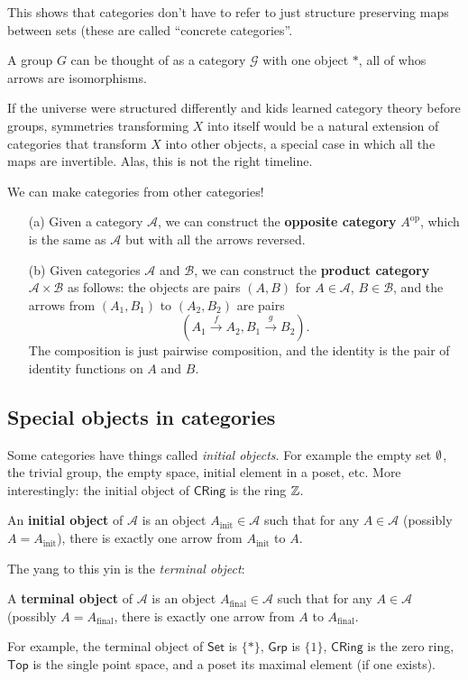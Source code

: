 This shows that categories don't have to refer to just structure preserving maps between sets (these are called ``concrete categories''.
\begin{example}
   A group $G $ can be thought of as a category $\mathcal{G} $ with one object $*$, all of whos arrows are isomorphisms. 

            If the universe were structured differently and kids learned category theory before groups, symmetries transforming $X$ into itself would be a natural extension of categories that transform $X$ into other objects, a special case in which all the maps are invertible. Alas, this is not the right timeline.
\end{example}
\begin{example}
We can make categories from other categories!
   \begin{enumerate}
       \item[(a)] Given a category $\mathcal{A} $, we can construct the \textbf{opposite category} $A^{\text{op}}$, which is the same as $\mathcal{A} $ but with all the arrows reversed.
       \item[(b)] Given categories $\mathcal{A} $ and $\mathcal{B} $, we can construct the \textbf{product category}  $\mathcal{A} \times \mathcal{B} $ as follows: the objects are pairs $(A,B)$ for $A\in \mathcal{A} $, $B\in \mathcal{B} $, and the arrows from $(A_1,B_1)$ to $(A_2,B_2)$ are pairs \[
               \left( A_1 \overset{f}{\to }A_2, B_1\overset{g}{\to }B_2 \right) .
       \] The composition is just pairwise composition, and the identity is the pair of identity functions on $A$ and $B$.
   \end{enumerate} 
\end{example}

\subsection{Special objects in categories}
Some categories have things called \emph{initial objects}. For example the empty set $\emptyset$, the trivial group, the empty space, initial element in a poset, etc. More interestingly: the initial object of $\mathsf{CRing} $ is the ring $\mathbb{Z}$.
\begin{definition}
    An \textbf{initial object} of $\mathcal{A} $ is an object $A_{\text{init}}\in \mathcal{A} $ such that for any $A\in \mathcal{A} $ (possibly $A=A_{\text{init}}$), there is exactly one arrow from $A_{\text{init}}$ to $A$.
\end{definition}
The yang to this yin is the \emph{terminal object}:
\begin{definition}
    A \textbf{terminal object} of $\mathcal{A} $ is an object $A_{\text{final}}\in \mathcal{A} $ such that for any $A\in \mathcal{A} $ (possibly $A=A_{\text{final}}$, there is exactly one arrow from $A$ to $A_{\text{final}}$. 
\end{definition}
For example, the terminal object of $\mathsf{Set} $ is $\{*\} $, $\mathsf{Grp} $ is $\{1\} $, $\mathsf{CRing} $ is the zero ring, $\mathsf{Top} $ is the single point space, and a poset its maximal element (if one exists).

